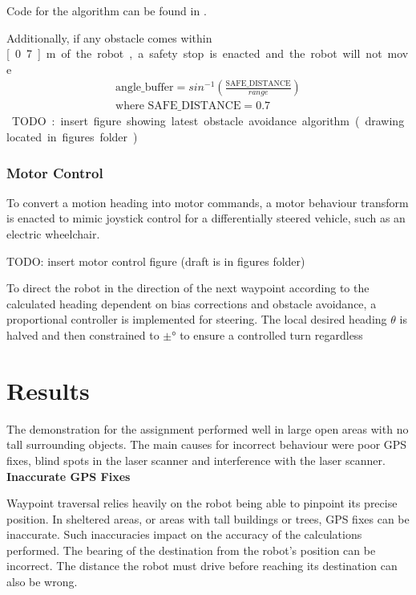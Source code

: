 \documentclass[titlepage,12pt,a4paper]{article}
\begin{document}
Code for the algorithm can be found in .

Additionally, if any obstacle comes within \unit[0.7]{m} of the robot, a safety stop is enacted and the robot will not move.

\begin{equation}
\begin{split}
	\text{angle\_buffer} = sin^{-1}(\frac{\text{SAFE\_DISTANCE}}{range})\\
	\text{where } \text{SAFE\_DISTANCE} = 0.7
\end{split}
	\label{equation:bearing_buffer}
\end{equation}

TODO: insert figure showing latest obstacle avoidance algorithm (drawing located in figures folder)
\subsubsection{Motor Control}

To convert a motion heading into motor commands, a motor behaviour transform is enacted to mimic joystick control for a differentially steered vehicle, such as an electric wheelchair.

TODO: insert motor control figure (draft is in figures folder)

To direct the robot in the direction of the next waypoint according to the calculated heading dependent on bias corrections and obstacle avoidance, a proportional controller is implemented for steering. The local desired heading $\theta$ is halved and then constrained to $\pm$\unit[30]{\degree} to ensure a controlled turn regardless

\pagebreak
\section{Results}

The demonstration for the assignment performed well in large open areas with no tall surrounding objects. The main causes for incorrect behaviour were poor GPS fixes, blind spots in the laser scanner and interference with the laser scanner. \\

\textbf{Inaccurate GPS Fixes}

Waypoint traversal relies heavily on the robot being able to pinpoint its precise position. In sheltered areas, or areas with tall buildings or trees, GPS fixes can be inaccurate. Such inaccuracies impact on the accuracy of the calculations performed. The bearing of the destination from the robot's position can be incorrect. The distance the robot must drive before reaching its destination can also be wrong. 
\end{document}

